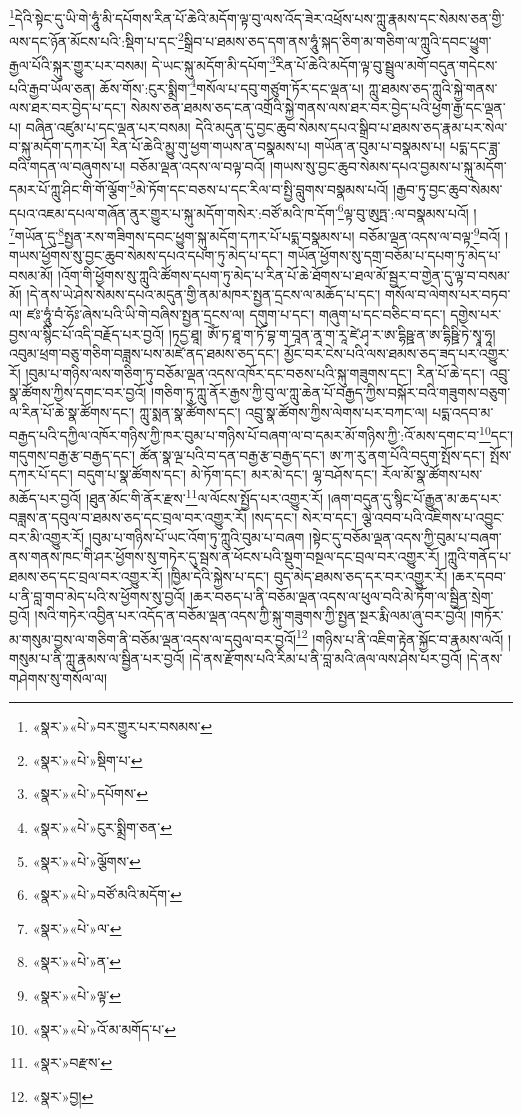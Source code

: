 \footnote{«སྣར་»«པེ་»བར་གྱུར་པར་བསམས་}དེའི་སྟེང་དུ་ཡི་གེ་ཧཱུཾ་མི་དཔོགས་རིན་པོ་ཆེའི་མདོག་ལྟ་བུ་ལས་འོད་ཟེར་འཕྲོས་པས་ཀླུ་རྣམས་དང་སེམས་ཅན་གྱི་ལས་དང་ཉོན་མོངས་པའི་:སྡིག་པ་དང་\footnote{«སྣར་»«པེ་»སྡིག་པ་}སྒྲིབ་པ་ཐམས་ཅད་དག་ནས་ཧཱུཾ་སྐད་ཅིག་མ་གཅིག་ལ་ཀླུའི་དབང་ཕྱུག་རྒྱལ་པོའི་སྐུར་གྱུར་པར་བསམ། དེ་ཡང་སྐུ་མདོག་མི་དཔོག་\footnote{«སྣར་»«པེ་»དཔོགས་}རིན་པོ་ཆེའི་མདོག་ལྟ་བུ་སྦྲུལ་མགོ་བདུན་གདེངས་པའི་རྒྱབ་ཡོལ་ཅན། ཆོས་གོས་:ངུར་སྨྲིག་\footnote{«སྣར་»«པེ་»ངུར་སྨྲིག་ཅན་}གསོལ་པ་དབུ་གཙུག་ཏོར་དང་ལྡན་པ། ཀླུ་ཐམས་ཅད་ཀླུའི་སྐྱེ་གནས་ལས་ཐར་བར་བྱེད་པ་དང་། སེམས་ཅན་ཐམས་ཅད་ངན་འགྲོའི་སྐྱེ་གནས་ལས་ཐར་བར་བྱེད་པའི་ཕྱག་རྒྱ་དང་ལྡན་པ། བཞིན་འཛུམ་པ་དང་ལྡན་པར་བསམ། དེའི་མདུན་དུ་བྱང་ཆུབ་སེམས་དཔའ་སྒྲིབ་པ་ཐམས་ཅད་རྣམ་པར་སེལ་བ་སྐུ་མདོག་དཀར་པོ། རིན་པོ་ཆེའི་མྱུ་གུ་ཕྱག་གཡས་ན་བསྣམས་པ། གཡོན་ན་བུམ་པ་བསྣམས་པ། པདྨ་དང་ཟླ་བའི་གདན་ལ་བཞུགས་པ། བཅོམ་ལྡན་འདས་ལ་བལྟ་བའོ། །གཡས་སུ་བྱང་ཆུབ་སེམས་དཔའ་བྱམས་པ་སྐུ་མདོག་དམར་པོ་ཀླུ་ཤིང་གི་གོ་ལྕོག་\footnote{«སྣར་»«པེ་»ལྕོགས་}མེ་ཏོག་དང་བཅས་པ་དང་རིལ་བ་སྤྱི་བླུགས་བསྣམས་པའོ། །རྒྱབ་ཏུ་བྱང་ཆུབ་སེམས་དཔའ་འཇམ་དཔལ་གཞོན་ནུར་གྱུར་པ་སྐུ་མདོག་གསེར་:བཙོ་མའི་ཁ་དོག་\footnote{«སྣར་»«པེ་»བཙོ་མའི་མདོག་}ལྟ་བུ་ཨུཏྤ་:ལ་བསྣམས་པའོ། །\footnote{«སྣར་»«པེ་»ལ་}གཡོན་དུ་\footnote{«སྣར་»«པེ་»ན་}སྤྱན་རས་གཟིགས་དབང་ཕྱུག་སྐུ་མདོག་དཀར་པོ་པདྨ་བསྣམས་པ། བཅོམ་ལྡན་འདས་ལ་བལྟ་\footnote{«སྣར་»«པེ་»ལྟ་}བའོ། །གཡས་ཕྱོགས་སུ་བྱང་ཆུབ་སེམས་དཔའ་དཔག་ཏུ་མེད་པ་དང་། གཡོན་ཕྱོགས་སུ་དགྲ་བཅོམ་པ་དཔག་ཏུ་མེད་པ་བསམ་མོ། །འོག་གི་ཕྱོགས་སུ་ཀླུའི་ཚོགས་དཔག་ཏུ་མེད་པ་རིན་པོ་ཆེ་ཐོགས་པ་ཐལ་མོ་སྦྱར་བ་གྱེན་དུ་ལྟ་བ་བསམ་མོ། །དེ་ནས་ཡེ་ཤེས་སེམས་དཔའ་མདུན་གྱི་ནམ་མཁར་སྤྱན་དྲངས་ལ་མཆོད་པ་དང་། གསོལ་བ་ལེགས་པར་བཏབ་ལ། ཛཿ་ཧཱུཾ་བཾ་ཧོཿ་ཞེས་པའི་ཡི་གེ་བཞིས་སྤྱན་དྲངས་ལ། དགུག་པ་དང་། གཞུག་པ་དང་བཅིང་བ་དང་། དགྱེས་པར་བྱས་ལ་སྙིང་པོ་འདི་བརྗོད་པར་བྱའོ། །ཏདྱ་ཐཱ། ཨོཾ་ཏ་ཐཱ་ག་ཏོ་བྷ་ག་བཱན་ནཱ་ག་རཱ་ཛེ་ཤྭ་ར་ཨ་དྷིཥྛ་ན་ཨ་དྷིཥྛི་ཏེ་སྭཱ་ཧཱ། འབུམ་ཕྲག་བཅུ་གཅིག་བཟླས་པས་མཛེ་ནད་ཐམས་ཅད་དང་། མྱོང་བར་ངེས་པའི་ལས་ཐམས་ཅད་ཟད་པར་འགྱུར་རོ། །བུམ་པ་གཉིས་ལས་གཅིག་ཏུ་བཅོམ་ལྡན་འདས་འཁོར་དང་བཅས་པའི་སྐུ་གཟུགས་དང་། རིན་པོ་ཆེ་དང་། འབྲུ་སྣ་ཚོགས་ཀྱིས་དགང་བར་བྱའོ། །གཅིག་ཏུ་ཀླུ་ནོར་རྒྱས་ཀྱི་བུ་ལ་ཀླུ་ཆེན་པོ་བརྒྱད་ཀྱིས་བསྐོར་བའི་གཟུགས་བཅུག་ལ་རིན་པོ་ཆེ་སྣ་ཚོགས་དང་། ཀླུ་སྨན་སྣ་ཚོགས་དང་། འབྲུ་སྣ་ཚོགས་ཀྱིས་ལེགས་པར་བཀང་ལ། པདྨ་འདབ་མ་བརྒྱད་པའི་དཀྱིལ་འཁོར་གཉིས་ཀྱི་ཁར་བུམ་པ་གཉིས་པོ་བཞག་ལ་བ་དམར་མོ་གཉིས་ཀྱི་:འོ་མས་དགང་བ་\footnote{«སྣར་»«པེ་»འོ་མ་མགོད་པ་}དང་། གདུགས་བརྒྱ་རྩ་བརྒྱད་དང་། ཚོན་སྣ་ལྔ་པའི་བ་དན་བརྒྱ་རྩ་བརྒྱད་དང་། ཨ་ཀ་རུ་ནག་པོའི་བདུག་སྤོས་དང་། སྤོས་དཀར་པོ་དང་། བདུག་པ་སྣ་ཚོགས་དང་། མེ་ཏོག་དང་། མར་མེ་དང་། ལྷ་བཤོས་དང་། རོལ་མོ་སྣ་ཚོགས་པས་མཆོད་པར་བྱའོ། །ཐུན་མོང་གི་ནོར་རྫས་\footnote{«སྣར་»བརྫས་}ལ་ལོངས་སྤྱོད་པར་འགྱུར་རོ། །ཞག་བདུན་དུ་སྙིང་པོ་རྒྱུན་མ་ཆད་པར་བཟླས་ན་དབུལ་བ་ཐམས་ཅད་དང་བྲལ་བར་འགྱུར་རོ། །སད་དང་། སེར་བ་དང་། ལྕེ་འབབ་པའི་འཇིགས་པ་འབྱུང་བར་མི་འགྱུར་རོ། །བུམ་པ་གཉིས་པོ་ཡང་འོག་ཏུ་ཀླུའི་བུམ་པ་བཞག །སྟེང་དུ་བཅོམ་ལྡན་འདས་ཀྱི་བུམ་པ་བཞག་ནས་གནས་ཁང་གི་ཤར་ཕྱོགས་སུ་གཏེར་དུ་སྦས་ན་ཕོངས་པའི་སྡུག་བསྔལ་དང་བྲལ་བར་འགྱུར་རོ། །ཀླུའི་གནོད་པ་ཐམས་ཅད་དང་བྲལ་བར་འགྱུར་རོ། །ཁྱིམ་དེའི་སྐྱེས་པ་དང་། བུད་མེད་ཐམས་ཅད་དར་བར་འགྱུར་རོ། །ཆར་དབབ་པ་ནི་བླ་གབ་མེད་པའི་ས་ཕྱོགས་སུ་བྱའོ། །ཆར་བཅད་པ་ནི་བཅོམ་ལྡན་འདས་ལ་ཕུལ་བའི་མེ་ཏོག་ལ་སྦྱིན་སྲེག་བྱའོ། །སའི་གཏེར་འབྱིན་པར་འདོད་ན་བཅོམ་ལྡན་འདས་ཀྱི་སྐུ་གཟུགས་ཀྱི་སྤྱན་སྔར་རྨི་ལམ་ཞུ་བར་བྱའོ། །གཏོར་མ་གསུམ་བྱས་ལ་གཅིག་ནི་བཅོམ་ལྡན་འདས་ལ་དབུལ་བར་བྱའོ།\footnote{«སྣར་»བྱ།} །གཉིས་པ་ནི་འཇིག་རྟེན་སྐྱོང་བ་རྣམས་ལའོ། །གསུམ་པ་ནི་ཀླུ་རྣམས་ལ་སྦྱིན་པར་བྱའོ། །དེ་ནས་རྫོགས་པའི་རིམ་པ་ནི་བླ་མའི་ཞལ་ལས་ཤེས་པར་བྱའོ། །དེ་ནས་གཤེགས་སུ་གསོལ་ལ། 